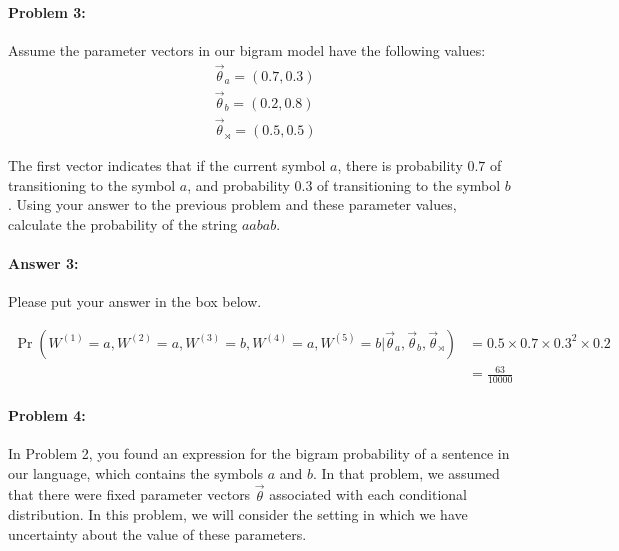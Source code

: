 \documentclass[10pt]{article}
\newenvironment{AnswerBox}{\begin{mdframed}[style=simple]}{\end{mdframed}}
\begin{document}
\paragraph{Problem 3:}


Assume the parameter vectors in our bigram model have the following values:
\begin{align*}
&\vec{\theta}_{a} = (0.7,0.3)\\
&\vec{\theta}_{b} = (0.2,0.8)\\
&\vec{\theta}_{\rtimes} = (0.5,0.5)
\end{align*}

 The first vector indicates that if the current symbol $a$,
there is probability $0.7$ of transitioning to the symbol $a$, and
probability $0.3$ of transitioning to the symbol $b$. Using your
answer to the previous problem and these parameter values, calculate
the probability of the string $aabab$.

\paragraph{Answer 3:} Please put your answer in the box below.


\begin{AnswerBox}%

\begin{align*}
    \Pr(W^{(1)} = a,W^{(2)} = a, W^{(3)} = b, W^{(4)} = a, W^{(5)} = b | \vec{\theta}_{a}, \vec{\theta}_{b}, \vec{\theta}_{\rtimes}) & = 0.5\times 0.7\times 0.3^2 \times 0.2 \\
    & = \frac{63}{10000}
\end{align*}
    
\end{AnswerBox}%


\hrulefill %

\paragraph{Problem 4:}

In Problem 2, you found an expression for the bigram probability of a
sentence in our language, which contains the symbols $a$ and $b$. In
that problem, we assumed that there were fixed parameter vectors
$\vec{\theta}$ associated with each conditional distribution. In this
problem, we will consider the setting in which we have uncertainty
about the value of these parameters.
\end{document}
